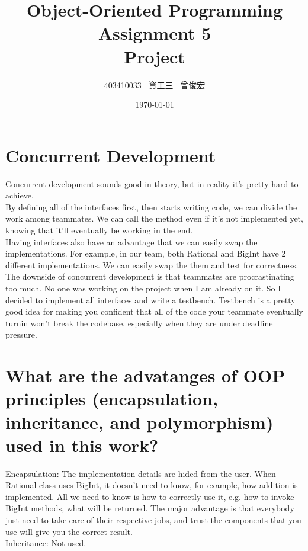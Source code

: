 \documentclass[12pt, A4]{article}
\title{Object-Oriented Programming\\ Assignment 5\\ Project}
\author{403410033 \ 資工三 \ 曾俊宏}
\date{\today}
\begin{document}
	
	\maketitle
	\newpage

    \section{Concurrent Development}
    
    Concurrent development sounds good in theory, but in reality it's pretty hard to achieve.\\
    
    By defining all of the interfaces first, then starts writing code, we can divide the work among teammates. We can call the method even if it's not implemented yet, knowing that it'll eventually be working in the end.\\
    
    Having interfaces also have an advantage that we can easily swap the implementations. For example, in our team, both Rational and BigInt have 2 different implementations. We can easily swap the them and test for correctness.\\
    
    The downside of concurrent development is that teammates are procrastinating too much. No one was working on the project when I am already on it. So I decided to implement all interfaces and write a testbench. Testbench is a pretty good idea for making you confident that all of the code your teammate eventually turnin won't break the codebase, especially when they are under deadline pressure.
    
    \section{What are the advatanges of OOP principles (encapsulation, inheritance, and polymorphism) used in this work?}
    
    Encapsulation: The implementation details are hided from the user. When Rational class uses BigInt, it doesn't need to know, for example, how addition is implemented. All we need to know is how to correctly use it, e.g. how to invoke BigInt methods, what will be returned. The major advantage is that everybody just need to take care of their respective jobs, and trust the components that you use will give you the correct result.\\
    
    Inheritance: Not used.\\
    
\end{document}
